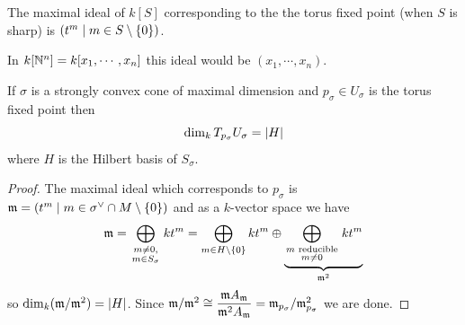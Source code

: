 \begin{remark}
The maximal ideal of $k[S]$ corresponding to the the torus fixed point (when $S$ is sharp) is $\left({t^m\mid m\in S\setminus\{0\}}\right)$.
\end{remark}
\begin{example}
In $k[\mathbb{N}^n]=k[x_1,\cdots, x_n]$ this ideal would be $(x_1,\cdots, x_n)$.
\end{example}

\begin{proposition}[]\label{PrDimensionOfTangentAtTorusFixedPoint}
If $\sigma$ is a strongly convex cone of maximal dimension and $p_\sigma\in U_\sigma$ is the torus fixed point then
\[\dim_k T_{p_\sigma}U_\sigma=\left|{H}\right|\]
where $H$ is the Hilbert basis of $S_\sigma$.
\end{proposition}
\begin{proof}
The maximal ideal which corresponds to $p_\sigma$ is $\mathfrak{m}=\left({t^m\mid m\in \sigma^\vee\cap M\setminus\{0\}}\right)$ and as a $k$-vector space we have
\[\mathfrak{m}=\bigoplus_{\begin{smallmatrix}m\neq 0,\\ m\in S_\sigma\end{smallmatrix}}kt^m=\bigoplus_{m\in H\setminus\{0\}}kt^m\oplus
\underset{\mathfrak{m}^2}{\underbrace{\bigoplus_{\begin{smallmatrix}m \text{ reducible}\\ m\neq 0\end{smallmatrix}}kt^m}}\]
so $\dim_k(\mathfrak{m}/\mathfrak{m}^2)=\left|{H}\right|$. Since $\mathfrak{m}/\mathfrak{m}^2\cong \dfrac{\mathfrak{m} A_{\mathfrak{m}}}{\mathfrak{m}^2A_{\mathfrak{m}}}=\mathfrak{m}_{p_\sigma}/\mathfrak{m}_{p_\sigma}^2$ we are done.
\end{proof}

